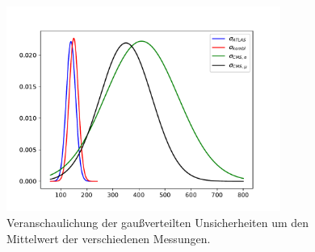 \begin{figure}
  \centering
  \includegraphics[width=0.8\textwidth]{Plots/gauss.pdf}
  \caption{Veranschaulichung der gaußverteilten Unsicherheiten um den Mittelwert der verschiedenen Messungen.}
  \label{fig:gau}
\end{figure}

